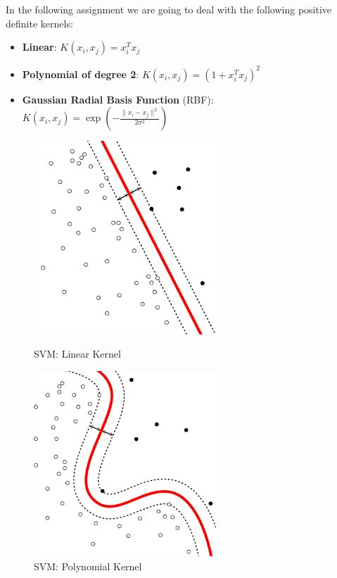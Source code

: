 \documentclass[11pt,a4paper]{article}
\begin{document}
In the following assignment we are going to deal with the following positive definite kernels:
\begin{itemize}
	\item \textbf{Linear}: $K(x_i,x_j) = x_i^Tx_j$
	\item \textbf{Polynomial of degree 2}: $K(x_i,x_j) = (1 + x_i^Tx_j)^2$
	\item \textbf{Gaussian Radial Basis Function} (RBF): 
	$K(x_i, x_j) = \exp\left(-\frac{\|x_i - x_j\|^2}{2\sigma^2}\right)$
\end{itemize}
\begin{figure}[!h]
	\begin{minipage}[t]{0.5\linewidth}
		\centering
		\includegraphics[width=0.61\textwidth]{img/Linear_Kernel_Machine.png}
		\caption{SVM: Linear Kernel}
		\label{f1}
	\end{minipage}
	\hspace{0.1cm}
	\begin{minipage}[t]{0.5\linewidth} 
		\centering
		\includegraphics[width=0.61\textwidth]{img/Poly_Kernel_Machine.png}
		\caption{SVM: Polynomial Kernel}
		\label{f2}
	\end{minipage}        
\end{figure} 
\end{document}
